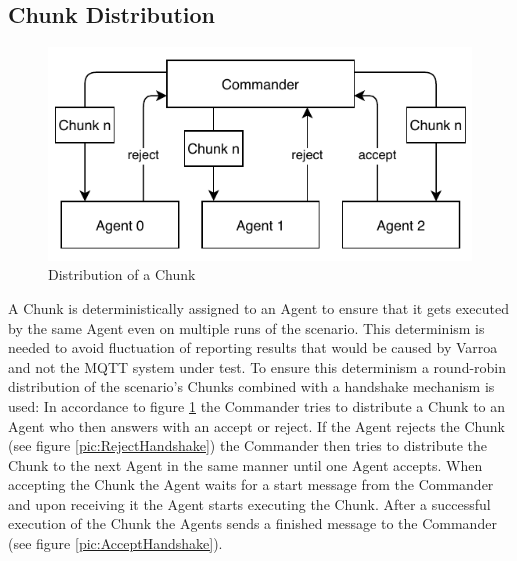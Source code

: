 \subsection{Chunk Distribution}\label{sec:chunkDistribution}
\begin{figure}[h]
	\begin{center}
	\includegraphics[scale=1.2]{Resources/PDF/ChunkDistribution}
	\caption{Distribution of a Chunk}
	\label{pic:ChunkDistribution}
	\end{center}
\end{figure}
A Chunk is deterministically assigned to an Agent to ensure that it gets executed by the same Agent even on multiple runs of the scenario. This determinism is needed to avoid fluctuation of reporting results that would be caused by Varroa and not the MQTT system under test.
To ensure this determinism a round-robin distribution of the scenario's Chunks combined with a handshake mechanism is used:
In accordance to figure \ref{pic:ChunkDistribution} the Commander tries to distribute a Chunk to an Agent who then answers with an accept or reject.
If the Agent rejects the Chunk (see figure \ref{pic:RejectHandshake}) the Commander then tries to distribute the Chunk to the next Agent in the same manner until one Agent accepts.
When accepting the Chunk the Agent waits for a start message from the Commander and upon receiving it the Agent starts executing the Chunk.
After a successful execution of the Chunk the Agents sends a finished message to the Commander (see figure \ref{pic:AcceptHandshake}).


